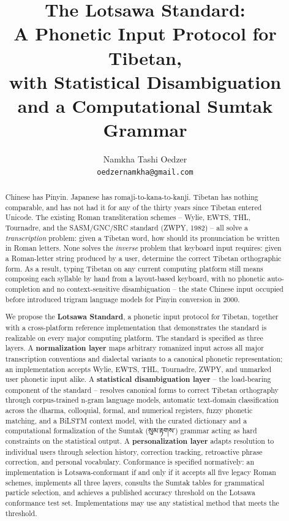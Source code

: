 \documentclass[11pt]{article}
\title{The Lotsawa Standard:\\
A Phonetic Input Protocol for Tibetan,\\
with Statistical Disambiguation and a Computational Sumtak Grammar}
\author{%
  Namkha Tashi Oedzer\\
  \texttt{oedzernamkha@gmail.com}
}
\date{}
\newcommand{\tib}[1]{{\fontspec{Jomolhari}#1}}
\begin{document}
\maketitle

\begin{abstract}
Chinese has Pinyin. Japanese has romaji-to-kana-to-kanji. Tibetan has nothing comparable, and has not had it for any of the thirty years since Tibetan entered Unicode. The existing Roman transliteration schemes -- Wylie, EWTS, THL, Tournadre, and the SASM/GNC/SRC standard (ZWPY, 1982) -- all solve a \emph{transcription} problem: given a Tibetan word, how should its pronunciation be written in Roman letters. None solves the \emph{inverse} problem that keyboard input requires: given a Roman-letter string produced by a user, determine the correct Tibetan orthographic form. As a result, typing Tibetan on any current computing platform still means composing each syllable by hand from a layout-based keyboard, with no phonetic auto-completion and no context-sensitive disambiguation -- the state Chinese input occupied before \citet{chen2000pinyin} introduced trigram language models for Pinyin conversion in 2000.

We propose the \textbf{Lotsawa Standard}, a phonetic input protocol for Tibetan, together with a cross-platform reference implementation that demonstrates the standard is realizable on every major computing platform. The standard is specified as three layers. A \textbf{normalization layer} maps arbitrary romanized input across all major transcription conventions and dialectal variants to a canonical phonetic representation; an implementation accepts Wylie, EWTS, THL, Tournadre, ZWPY, and unmarked user phonetic input alike. A \textbf{statistical disambiguation layer} -- the load-bearing component of the standard -- resolves canonical forms to correct Tibetan orthography through corpus-trained n-gram language models, automatic text-domain classification across the dharma, colloquial, formal, and numerical registers, fuzzy phonetic matching, and a BiLSTM context model, with the curated dictionary and a computational formalization of the Sumtak (\tib{སུམ་རྟགས་}) grammar acting as hard constraints on the statistical output. A \textbf{personalization layer} adapts resolution to individual users through selection history, correction tracking, retroactive phrase correction, and personal vocabulary. Conformance is specified normatively: an implementation is Lotsawa-conformant if and only if it accepts all five legacy Roman schemes, implements all three layers, consults the Sumtak tables for grammatical particle selection, and achieves a published accuracy threshold on the Lotsawa conformance test set. Implementations may use any statistical method that meets the threshold.


\end{abstract}
\end{document}

